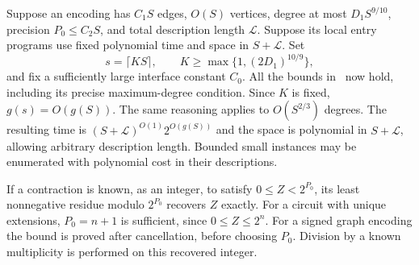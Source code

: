 Suppose an encoding has $C_1S$ edges, $O(S)$ vertices, degree at most
$D_1S^{9/10}$, precision $P_0\le C_2S$, and total description length
$\mathcal L$. Suppose its local entry programs use fixed polynomial
time and space in $S+\mathcal L$. Set
\begin{equation}\label{eq:rescale}
 s=\lceil KS\rceil,\qquad
 K\ge\max\{1,(2D_1)^{10/9}\},
\end{equation}
and fix a sufficiently large interface constant $C_0$. All the bounds
in \HTC\ now hold, including its precise maximum-degree condition.
Since $K$ is fixed, $g(s)=O(g(S))$. The same reasoning applies to
$O(S^{2/3})$ degrees. The resulting time is
$(S+\mathcal L)^{O(1)}2^{O(g(S))}$ and the space is polynomial in
$S+\mathcal L$, allowing arbitrary description length. Bounded small
instances may be enumerated with polynomial cost in their descriptions.

If a contraction is known, as an integer, to satisfy
$0\le Z<2^{P_0}$, its least nonnegative residue modulo $2^{P_0}$
recovers $Z$ exactly. For a circuit with unique extensions, $P_0=n+1$
is sufficient, since $0\le Z\le2^n$. For a signed graph encoding the
bound is proved after cancellation, before choosing $P_0$. Division by
a known multiplicity is performed on this recovered integer.
